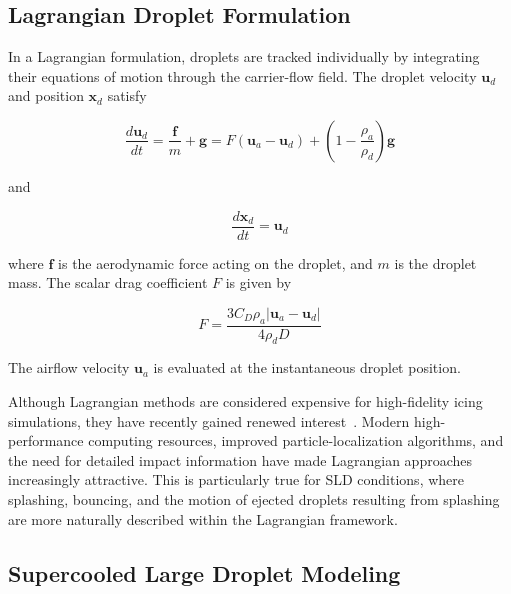 \subsection{Lagrangian Droplet Formulation}\label{sec:LagDropTracking}

In a Lagrangian formulation, droplets are tracked individually by integrating their equations of motion through the carrier-flow field. The droplet velocity $\boldsymbol{u}_d$ and position $\boldsymbol{x}_d$ satisfy

\begin{equation}
\frac{d\boldsymbol{u}_d}{dt}
=
\frac{\boldsymbol{f}}{m}
+
\boldsymbol{g}
=
F\left(\boldsymbol{u}_a-\boldsymbol{u}_d\right)
+
\left(1-\frac{\rho_a}{\rho_d}\right)\boldsymbol{g}
\label{eq:review_eqOfMotion}
\end{equation}

and

\begin{equation}
\frac{d\boldsymbol{x}_d}{dt}
=
\boldsymbol{u}_d
\label{eq:lag_position}
\end{equation}

where $\boldsymbol{f}$ is the aerodynamic force acting on the droplet, and $m$ is the droplet mass. The scalar drag coefficient $F$ is given by

\begin{equation}
F =
\frac{3 C_D \rho_a
\left|\boldsymbol{u}_a-\boldsymbol{u}_d\right|}
{4 \rho_d D}
\label{eq:review_forceCoef}
\end{equation}

The airflow velocity $\boldsymbol{u}_a$ is evaluated at the instantaneous droplet position.

Although Lagrangian methods are considered expensive for high-fidelity icing simulations, they have recently gained renewed interest~\cite{isikLagrangian,bellosta2023lagrangian,zaidSabriLagrangian,sirianni2023numerical,baldan2021scalable}. Modern high-performance computing resources, improved particle-localization algorithms, and the need for detailed impact information have made Lagrangian approaches increasingly attractive. This is particularly true for SLD conditions, where splashing, bouncing, and the motion of ejected droplets resulting from splashing are more naturally described within the Lagrangian framework.

\subsection{Supercooled Large Droplet Modeling}\label{sec:review_sld}

